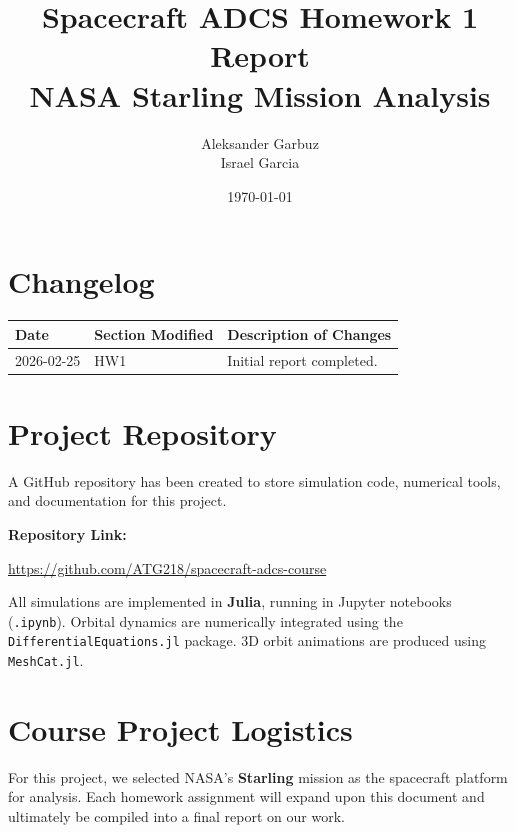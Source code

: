 \documentclass[12pt]{article}
\title{Spacecraft ADCS Homework 1 Report\\
NASA Starling Mission Analysis}
\author{Aleksander Garbuz \\ Israel Garcia}
\date{\today}
\begin{document}
\maketitle


\section*{Changelog}

\begin{center}
\begin{tabular}{| m{3cm} | m{4cm} | m{6cm} |}
\hline
\textbf{Date} & \textbf{Section Modified} & \textbf{Description of Changes} \\
\hline
2026-02-25 & HW1 & Initial report completed. \\
\hline
\end{tabular}
\end{center}

\vspace{1cm}


\section*{Project Repository}

A GitHub repository has been created to store simulation code, numerical tools, and documentation for this project.

\textbf{Repository Link:}

\noindent
\url{https://github.com/ATG218/spacecraft-adcs-course}

All simulations are implemented in \textbf{Julia}, running in Jupyter notebooks (\texttt{.ipynb}).
Orbital dynamics are numerically integrated using the \texttt{DifferentialEquations.jl} package.
3D orbit animations are produced using \texttt{MeshCat.jl}.

\vspace{1cm}


\section{Course Project Logistics}

For this project, we selected NASA's \textbf{Starling} mission as the spacecraft platform for analysis. Each homework assignment will expand upon this document and ultimately be compiled into a final report on our work.
\end{document}
